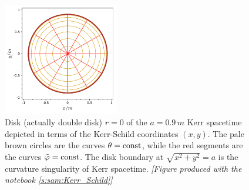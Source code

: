 \begin{figure}
\centerline{\includegraphics[width=0.45\textwidth]{ksm_rzero_disk.pdf}}
\caption[]{\label{f:ksm:rzero_disk} \footnotesize
Disk (actually double disk) $r=0$ of the $a=0.9\, m$ Kerr spacetime depicted in terms of
the Kerr-Schild coordinates $(x,y)$. The pale brown circles are the curves
$\theta=\mathrm{const}$, while the red segments are the curves ${\tilde\varphi}=\mathrm{const}$.
The disk boundary at
$\sqrt{x^2 + y^2} = a$ is the curvature singularity
of Kerr spacetime.
\textsl{[Figure produced with the notebook \ref{s:sam:Kerr_Schild}]}
}
\end{figure}

